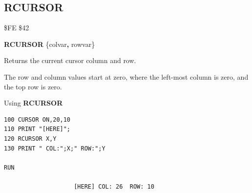\subsection{RCURSOR}
\begin{description}[leftmargin=2cm,style=nextline]
\item [Token:] \$FE \$42
\item [Format:] {\bf RCURSOR} \{colvar{\bf,} rowvar\}
\item [Usage:]  Returns the current cursor column and row.

\item [Remarks:] The row and column values start at zero, where
                 the left-most column is zero, and the top row is zero.

\item [Example:] Using {\bf RCURSOR}

\begin{tcolorbox}[colback=black,coltext=white]
\verbatimfont{\codefont}
\begin{verbatim}
100 CURSOR ON,20,10
110 PRINT "[HERE]";
120 RCURSOR X,Y
130 PRINT " COL:";X;" ROW:";Y

RUN

                    [HERE] COL: 26  ROW: 10
\end{verbatim}
\end{tcolorbox}
\end{description}


\newpage

